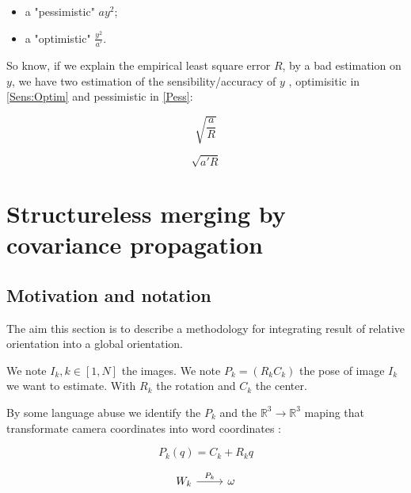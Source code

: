 \begin{itemize}
   \item a "pessimistic" $a y^2$;
   \item a "optimistic" $\frac{y^2}{a'}$.
\end{itemize}

So know, if we explain the empirical least square error $R$, by
a bad estimation on $y$, we have two estimation of the sensibility/accuracy of $y$ ,
optimisitic in \ref{Sens:Optim} and pessimistic in \ref{Pess}:

\begin{equation}
  \sqrt{\frac{a}{R}}
  \label{Sens:Optim}
\end{equation}


\begin{equation}
  \sqrt{a'R}
  \label{Sens:Pess}
\end{equation}


\section{Structureless merging by covariance propagation}

\subsection{Motivation and notation}

The aim this section is to describe a methodology for integrating
result of relative orientation into a global orientation.

We note  $I_k, k \in [1,N] $ the images.
We note  $P_k = (R_k C_k) $ the pose of image $I_k$ we want to estimate.
With $R_k$ the rotation and $C_k$ the center.

By some language abuse we identify the $P_k$ and the $\mathbb{R}^3 \to  \mathbb{R}^3$ maping
that transformate camera coordinates into word coordinates :

\begin{equation}
   P_k(q) = C_k + R_k q
\end{equation}


\begin{equation}
\begin{tikzcd}
   W_k \arrow[r, "P_k"] &  \omega
\end{tikzcd}
\end{equation}

